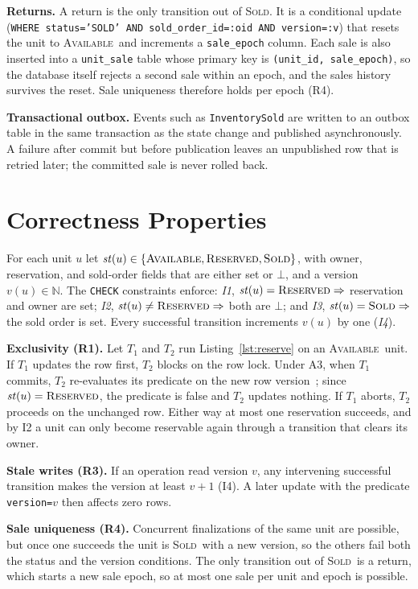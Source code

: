 \documentclass[conference]{IEEEtran}
\newcommand{\Av}{\textsc{Available}}
\newcommand{\Rs}{\textsc{Reserved}}
\newcommand{\So}{\textsc{Sold}}
\begin{document}
\textbf{Returns.}
A return is the only transition out of \So. It is a conditional update
(\texttt{WHERE status='SOLD' AND sold\_order\_id=:oid AND
version=:v}) that resets the unit to \Av\ and increments a
\texttt{sale\_epoch} column. Each sale is also inserted into a
\texttt{unit\_sale} table whose primary key is
\texttt{(unit\_id, sale\_epoch)}, so the database itself rejects a
second sale within an epoch, and the sales history survives the
reset. Sale uniqueness therefore holds per epoch (R4).

\textbf{Transactional outbox.}
Events such as \texttt{InventorySold} are written to an outbox table
in the same transaction as the state change and published
asynchronously. A failure after commit but before publication leaves
an unpublished row that is retried later; the committed sale is never
rolled back.

\section{Correctness Properties}
\label{sec:correctness}

For each unit $u$ let $\mathit{st}(u)\in\{\Av,\Rs,\So\}$, with owner,
reservation, and sold-order fields that are either set or $\bot$, and a
version $v(u)\in\mathbb{N}$. The \texttt{CHECK} constraints enforce:
\emph{I1}, $\mathit{st}(u)=\Rs \Rightarrow$ reservation and owner are
set; \emph{I2}, $\mathit{st}(u)\neq\Rs \Rightarrow$ both are $\bot$;
and \emph{I3}, $\mathit{st}(u)=\So \Rightarrow$ the sold order is set.
Every successful transition increments $v(u)$ by one (\emph{I4}).

\textbf{Exclusivity (R1).}
Let $T_1$ and $T_2$ run Listing~\ref{lst:reserve} on an \Av\ unit. If
$T_1$ updates the row first, $T_2$ blocks on the row lock. Under A3,
when $T_1$ commits, $T_2$ re-evaluates its predicate on the new row
version~\cite{refPGIsolation}; since $\mathit{st}(u)=\Rs$, the
predicate is false and $T_2$ updates nothing. If $T_1$ aborts, $T_2$
proceeds on the unchanged row. Either way at most one reservation
succeeds, and by I2 a unit can only become reservable again through a
transition that clears its owner.

\textbf{Stale writes (R3).}
If an operation read version $v$, any intervening successful
transition makes the version at least $v+1$ (I4). A later update with
the predicate \texttt{version=$v$} then affects zero rows.

\textbf{Sale uniqueness (R4).}
Concurrent finalizations of the same unit are possible, but once one
succeeds the unit is \So\ with a new version, so the others fail both
the status and the version conditions. The only transition out of
\So\ is a return, which starts a new sale epoch, so at most one sale
per unit and epoch is possible.
\end{document}
